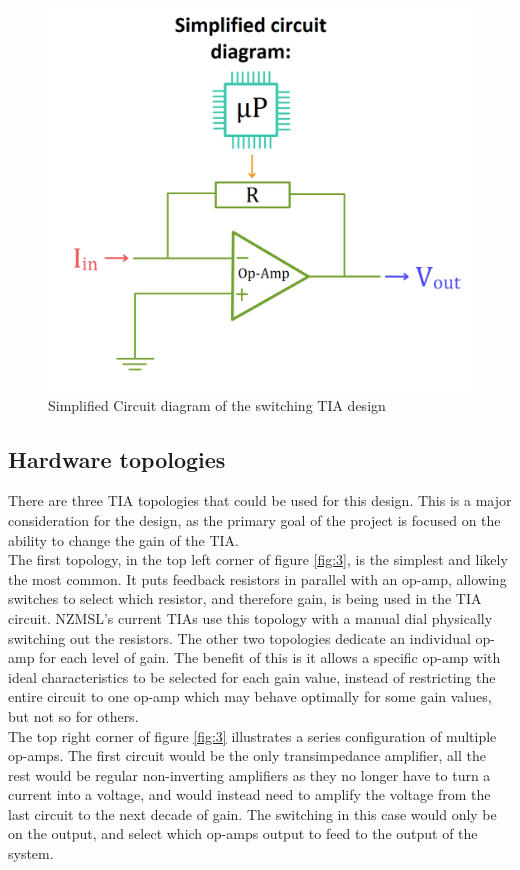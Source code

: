 \documentclass[conference]{IEEEtran}
\begin{document}
\begin{figure}
    \centering
    \includegraphics[width=0.8\linewidth]{Simplified_Circuit_Diagramv2.png}
    \caption{Simplified Circuit diagram of the switching TIA design}
    \label{fig:2}
\end{figure}

\subsection{Hardware topologies}

There are three TIA topologies that could be used for this design. This is a major consideration for the design, as the primary goal of the project is focused on the ability to change the gain of the TIA. \\

The first topology, in the top left corner of figure \ref{fig:3}, is the simplest and likely the most common. It puts feedback resistors in parallel with an op-amp, allowing switches to select which resistor, and therefore gain, is being used in the TIA circuit. NZMSL’s current TIAs use this topology with a manual dial physically switching out the resistors.
The other two topologies dedicate an individual op-amp for each level of gain. The benefit of this is it allows a specific op-amp with ideal characteristics to be selected for each gain value, instead of restricting the entire circuit to one op-amp which may behave optimally for some gain values, but not so for others. \\

The top right corner of figure \ref{fig:3} illustrates a series configuration of multiple op-amps. The first circuit would be the only transimpedance amplifier, all the rest would be regular non-inverting amplifiers as they no longer have to turn a current into a voltage, and would instead need to amplify the voltage from the last circuit to the next decade of gain. The switching in this case would only be on the output, and select which op-amps output to feed to the output of the system.  \\
\end{document}
